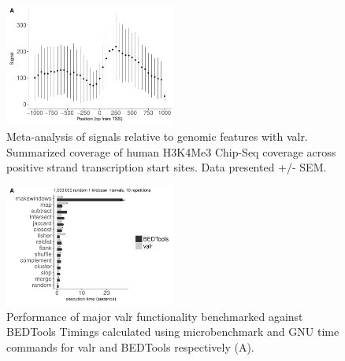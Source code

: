 \documentclass[9pt,a4paper]{extarticle}
\begin{document}

\begin{figure}[!htb]
\centering
\includegraphics[width=0.5\textwidth]{figure2.pdf}
\caption{\label{fig:Figure 2}Meta-analysis of signals relative to genomic features with valr. \textnormal{Summarized coverage of human H3K4Me3 Chip-Seq coverage across positive strand transcription start sites. Data presented +/- SEM.}}
\end{figure}

\begin{figure}[!htb]
\centering
\includegraphics[width=0.5\textwidth]{figure3.pdf}
\caption{\label{fig:Figure 3} Performance of major valr functionality benchmarked against BEDTools \textnormal{Timings calculated using microbenchmark and GNU time commands for valr and BEDTools respectively (A).}}
\end{figure}


\end{document}

